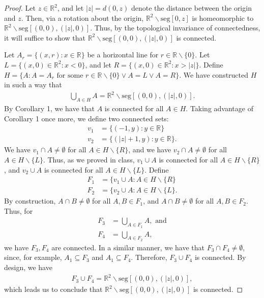\documentclass[10pt,a4paper]{article}
\theoremstyle{theorem}
\theoremstyle{definition}
\begin{document}
\begin{proof}
Let $z \in \mathbb{R}^2$, and let $|z| = d(0, z)$ denote the distance between the origin and $z$. Then, via a rotation about the origin, $\mathbb{R}^2 \backslash \text{seg}[0, z]$ is homeomorphic to $\mathbb{R}^2 \backslash \text{seg}[(0, 0), (|z|, 0)]$. Thus, by the topological invariance of connectedness, it will suffice to show that $\mathbb{R}^2 \backslash \text{seg}[(0, 0), (|z|, 0)]$ is connected.

Let $A_r = \{(x, r): x \in \mathbb{R}\}$ be a horizontal line for $r \in \mathbb{R}\backslash\{0\}$. Let $L = \{(x, 0) \in \mathbb{R}^2: x < 0\}$, and let $R = \{(x, 0) \in \mathbb{R}^2: x > |z| \}$. Define $H = \{A: A = A_r \text{ for some } r\in \mathbb{R}\backslash\{0\} \lor A = L \lor A = R \}$. We have constructed $H$ in such a way that
\begin{align*}
 \bigcup_{A \in H} A = \mathbb{R}^2 \backslash \text{seg}[(0, 0), (|z|, 0)].
\end{align*}
By Corollary 1, we have that $A$ is connected for all $A \in H$. Taking advantage of Corollary 1 once more, we define two connected sets:
\begin{align*}
v_1 &= \{(-1, y) : y \in \mathbb{R}\}\\
v_2 &= \{(|z| + 1, y) : y \in \mathbb{R}\}.
\end{align*}
We have $v_1 \cap A \not = \emptyset$ for all $A \in H \backslash\{R\}$, and we have $v_2 \cap A \not = \emptyset$ for all $A \in H \backslash\{L\}$. Thus, as we proved in class,  $v_1 \cup A$ is connected for all $A \in H \backslash\{R\}$, and $v_2 \cup A$ is connected for all $A \in H \backslash\{L\}$.  Define 
\begin{align*}
F_1 &= \{v_1 \cup A: A \in H \backslash\{R\}\\
F_2 &= \{v_2 \cup A: A \in H \backslash\{L\}.
\end{align*}
By construction,  $A \cap B \not = \emptyset$ for all $A, B \in F_1$, and $A \cap B \not = \emptyset$ for all $A, B \in F_2$. Thus,  for
\begin{align*}
F_3 &= \bigcup_{A \in F_1} A, \text{ and}\\
F_4 &=\bigcup_{A \in F_2} A, 
\end{align*}
we have $F_3, F_4$ are connected. In a similar manner, we have that $F_3 \cap F_4 \not = \emptyset$, since, for example, $A_1 \subseteq F_3$ and $A_1 \subseteq F_4$. Therefore, $F_3 \cup F_4$ is connected.  By design, we have 
\begin{align*}
F_3 \cup F_4 = \mathbb{R}^2 \backslash \text{seg}[(0, 0), (|z|, 0)],
\end{align*}
which leads us to conclude that $\mathbb{R}^2 \backslash \text{seg}[(0, 0), (|z|, 0)]$ is connected.
\end{proof}
\end{document}
